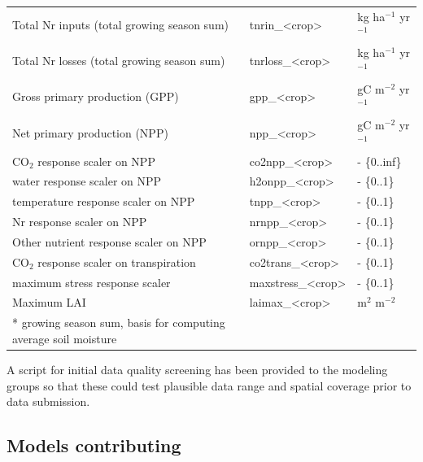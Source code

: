 \documentclass[gmd, manuscript]{copernicus} %
\begin{document}
\begin{table}[]
\begin{tabular}{lll}
Total Nr inputs (total growing season sum)               & tnrin\_<crop>     & kg ha$^{-1}$ yr$^{-1}$              \\
Total Nr losses (total growing season sum)               & tnrloss\_<crop>   & kg ha$^{-1}$ yr$^{-1}$              \\
Gross primary production (GPP)                           & gpp\_<crop>       & gC m$^{-2}$ yr$^{-1}$               \\
Net primary production (NPP)                             & npp\_<crop>       & gC m$^{-2}$ yr$^{-1}$               \\
CO$_2$ response scaler on NPP                            & co2npp\_<crop>    & - \{0..inf\}                \\
water response scaler on NPP                             & h2onpp\_<crop>    & - \{0..1\}                  \\
temperature response scaler on NPP                       & tnpp\_<crop>      & - \{0..1\}                  \\
Nr response scaler on NPP                                & nrnpp\_<crop>     & - \{0..1\}                  \\
Other nutrient response scaler on NPP                    & ornpp\_<crop>     & - \{0..1\}                  \\
CO$_2$ response scaler on transpiration                  & co2trans\_<crop>  & - \{0..1\}                  \\
maximum stress response scaler                           & maxstress\_<crop> & - \{0..1\}                  \\
Maximum LAI                                              & laimax\_<crop>    & m$^{2}$ m$^{-2}$           \\        
\bottomhline
* growing season sum, basis for computing average soil moisture & {} & {} \\
\end{tabular}
\end{table}

A script for initial data quality screening has been provided to the modeling groups so that these could test plausible data range and spatial coverage prior to data submission.


\subsection{Models contributing}
\end{document}
